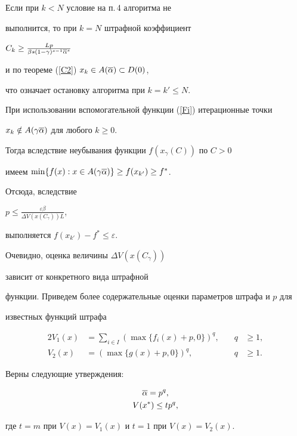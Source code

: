 \begin{pf}


Если при $k<N$ условие на п.\,4 алгоритма не


выполнится, то при $k=N$ штрафной коэффициент 


$C_k\geq\frac{Lp}{\beta s(1-\gamma)^{s-1}\overline\alpha^s}$


и по теореме (\ref{C2}) $x_k\in A(\overline\alpha)\subset D(0)$, 


что означает остановку алгоритма при $k=k'\leq N$.


При использовании вспомогательной функции (\ref{Fi}) итерационные точки


$x_k\notin A(\gamma \overline\alpha)$ для любого $k\geq 0$. 


Тогда вследствие неубывания функции $f(x_\gamma(C))$ по $C>0$ 


имеем $\min\{f(x): x\in A(\gamma\overline\alpha)\}\geq f(x_{k'})\geq f^*$.


Отсюда, вследствие


$p\leq\frac{\varepsilon\beta}{\Delta V(x(C_\gamma))L}$, 


выполняется $f(x_{k'})-f^*\leq\varepsilon$.


\end{pf}





Очевидно, оценка величины $\Delta V(x(C_\gamma))$ 


зависит от конкретного вида штрафной


функции. Приведем более содержательные оценки параметров штрафа и $p$ для


известных функций штрафа


\begin{alignat}{2}


V_1(x)&=\sum_{i\in I}(\max\{f_i(x)+p,0\})^q, &\quad q&\geq 1, \label{stf1}\\


V_2(x)&=(\max\{g(x)+p,0\})^q, &\quad q&\geq 1. \label{stf2}


\end{alignat}





\begin{lem}


Верны следующие утверждения\/${:}$


\begin{gather}


\o\alpha =p^q,\notag \\


V(x^*)\leq tp^q,\label{v*}


\end{gather}


где $t=m$ при $V(x)=V_1(x)$ и $t=1$ при $V(x)=V_2(x)$.


\end{lem}





